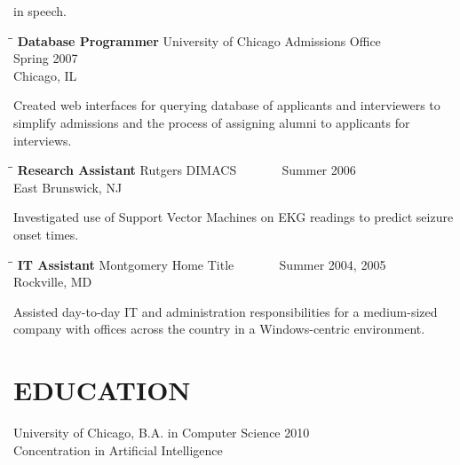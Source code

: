 \documentclass{res}
\begin{document}
\begin{resume}
   in speech.
   \begin{tabbing}
   \hspace{2.3in}\= \hspace{2.6in}\= \kill %
    {\bf Database Programmer } \>University of Chicago Admissions Office \> ~~~~~~ Spring 2007\\
                             \>Chicago, IL
   \end{tabbing}\vspace{-20pt}      %
   Created web interfaces for querying database of applicants and interviewers to simplify admissions and the process of assigning alumni to applicants for interviews.
   \begin{tabbing}%
   \hspace{2.3in}\= \hspace{2.6in}\= \kill %
   {\bf Research Assistant}  \>Rutgers DIMACS \> ~~~~~~ Summer 2006\\
                          \>East Brunswick, NJ
   \end{tabbing}\vspace{-20pt}
   Investigated use of Support Vector Machines on EKG readings to predict seizure onset times.
   \begin{tabbing}
   \hspace{2.3in}\= \hspace{2.6in}\= \kill %
    {\bf IT Assistant} \>Montgomery Home Title \> ~~~~~~ Summer 2004, 2005\\
                             \>Rockville, MD
   \end{tabbing}\vspace{-20pt}      %
   Assisted day-to-day IT and administration responsibilities for a medium-sized company with offices across the country in a Windows-centric environment. 



\section{EDUCATION}          
    University of Chicago, B.A. in Computer Science 2010  \\   
    Concentration in Artificial Intelligence      
 

\end{resume}
\end{document}
